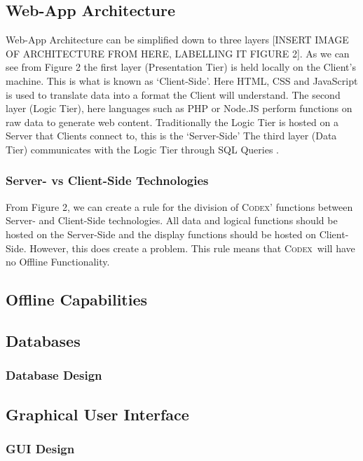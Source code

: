\documentclass[review]{cmpreport}
\newcommand{\Codex}{\textsc{Codex}}
\begin{document}
	\subsection{Web-App Architecture}
	Web-App Architecture can be simplified down to three layers [INSERT IMAGE OF ARCHITECTURE FROM \cite{SecurityWebApps} HERE, LABELLING IT FIGURE 2]. As we can see from Figure 2 the first layer (Presentation Tier) is held locally on the Client's machine. This is what is known as `Client-Side'. Here HTML, CSS and JavaScript is used to translate data into a format the Client will understand. The second layer (Logic Tier), here languages such as PHP or Node.JS perform functions on raw data to generate web content. Traditionally the Logic Tier is hosted on a Server that Clients connect to, this is the `Server-Side' The third layer (Data Tier) communicates with the Logic Tier through SQL Queries \cite{SecurityWebApps}.
	
	\subsubsection{Server- vs Client-Side Technologies}
	From Figure 2, we can create a rule for the division of \Codex' functions between Server- and Client-Side technologies. All data and logical functions should be hosted on the Server-Side and the display functions should be hosted on Client-Side. However, this does create a problem. This rule means that \Codex \ will have no Offline Functionality. 
	
	\subsection{Offline Capabilities}

	\subsection{Databases}
	\subsubsection{Database Design}

	\subsection{Graphical User Interface}
	\subsubsection{GUI Design}
\end{document}
